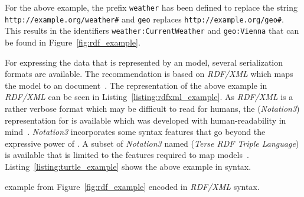 For the above example, the prefix \texttt{weather} has been defined to replace the string \texttt{http://\hspace{0pt}example.org/weather\#} and \texttt{geo} replaces \texttt{http://example.org/geo\#}. This results in the identifiers \texttt{weather:CurrentWeather} and \texttt{geo:Vienna} that can be found in Figure~\ref{fig:rdf_example}.

For expressing the data that is represented by an  model, several serialization formats are available. The  recommendation is based on \emph{RDF/XML} which maps the  model to an  document~\cite{RDF_XML}. The representation of the above example in \emph{RDF/XML} can be seen in Listing~\ref{listing:rdfxml_example}. As \emph{RDF/XML} is a rather verbose format which may be difficult to read for humans, the  (\emph{Notation3}) representation for  is available which was developed with human-readability in mind~\cite{Notation3}. \emph{Notation3} incorporates some syntax features that go beyond the expressive power of . A subset of \emph{Notation3} named  (\emph{Terse RDF Triple Language}) is available that is limited to the features required to map  models~\cite{Turtle}. Listing~\ref{listing:turtle_example} shows the above example in  syntax.


\begin{mintlisting}

\caption{ example from Figure~\ref{fig:rdf_example} encoded in \emph{RDF/XML} syntax.}
\label{listing:rdfxml_example}
\end{mintlisting}


